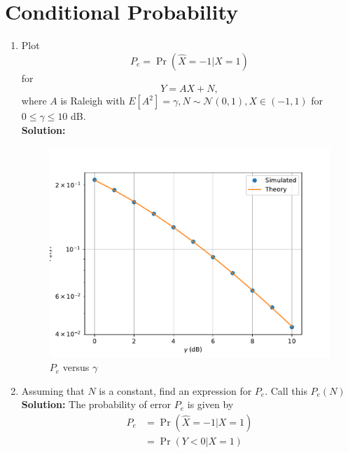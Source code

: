 \documentclass[12pt]{book}
\providecommand{\pr}[1]{\ensuremath{\Pr\left(#1\right)}}
\providecommand{\sbrak}[1]{\ensuremath{{}\left[#1\right]}}
\providecommand{\brak}[1]{\ensuremath{\left(#1\right)}}
\newcommand{\solution}{\noindent \textbf{Solution: }}
\providecommand{\gauss}[2]{\mathcal{N}\ensuremath{\left(#1,#2\right)}}
\begin{document}
\section{Conditional Probability}
\begin{enumerate}
\item
\label{ch4_sim}
Plot 
\begin{equation}
P_e = \pr{\hat{X} = -1|X=1}
\end{equation}
%
for 
\begin{equation}
Y = AX+N,
\end{equation}
where $A$ is Raleigh with $E\sbrak{A^2} = \gamma, N \sim \gauss{0}{1}, X \in \brak{-1,1}$ for $0 \le \gamma \le 10$ dB.\\
\solution
\begin{center}
\end{center}
\begin{figure}[H]
\centering
\includegraphics[width=\columnwidth]{./figs/4/4.2.1.pdf}
\caption{$P_e$ versus $\gamma$}
\label{fig:p_e&gamma}
\end{figure}
\item
Assuming that $N$ is a constant, find an expression for $P_e$.  Call this $P_e(N)$\\
\solution The probability of error $P_e$ is given by
\begin{align}
P_e &= \pr{\hat{X} = -1|X=1} \\
&= \pr{Y<0|X=1} \\

\end{align}
\end{enumerate}
\end{document}
